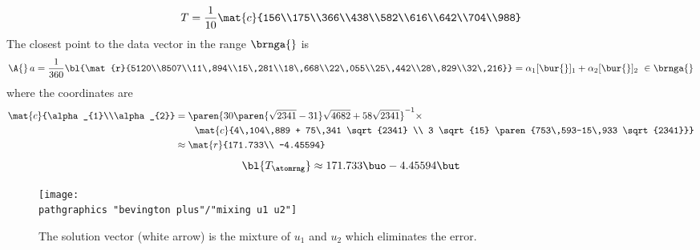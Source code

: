   \begin{equation*}
        T = \frac{1}{10}\mat{c}{156\\175\\366\\438\\582\\616\\642\\704\\988}
  \end{equation*}
The closest point to the data vector in the range $\brnga{}$ is
  \begin{equation*}
        \A{}\,a = \frac{1}{360}\bl{\mat{r}{5120\\8507\\11\,894\\15\,281\\18\,668\\22\,055\\25\,442\\28\,829\\32\,216}}
         = \alpha_{1} [\bur{}]_{1} + \alpha_{2} [\bur{}]_{2} \ \in\brnga{}
  \end{equation*}
where the coordinates are
  \begin{equation*}
    \begin{split}
      \mat{c}{\alpha_{1}\\\alpha_{2}} &
        = \paren{30\paren{\sqrt{2341}-31}\sqrt{4682}+58\sqrt{2341}}^{-1} \times \\
        & \qquad 
      \mat{c}{4\,104\,889 + 75\,341 \sqrt{2341} \\ 3 \sqrt{15} \paren{753\,593-15\,933 \sqrt{2341}}} \\ &
      \approx
      \mat{r}{171.733\\ -4.45594}
    \end{split}
    \label{eq:alpha}
  \end{equation*}
  \begin{equation*}   %
    \bl{T_{\atomrng}} \approx 171.733 \buo -4.45594 \but  
  \end{equation*}
\begin{figure}[htbp] %
   \centering
   \texttt{[image: \\pathgraphics "bevington plus"/"mixing u1 u2"]} 
   \caption[The solution vector is the mixture of $u_{1}$ and $u_{2}$ which eliminates error.]{The solution vector (white arrow) is the mixture of $u_{1}$ and $u_{2}$ which eliminates the error.}
   \label{fig:u min}
\end{figure}
